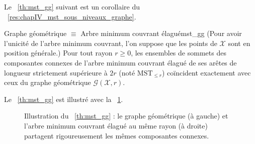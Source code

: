 
Le \Th~\ref{th:mst_gg} suivant est un corollaire du \Res~\ref{res:chapIV_mst_sous_niveaux_graphe}.

\begin{Theoreme}{Graphe géométrique $\equiv$ Arbre minimum couvrant élagué}{mst_gg}
(Pour avoir l'unicité de l'arbre minimum couvrant, l'on suppose que les points de $\mathcal X$ sont en position générale.) 
Pour tout rayon $r \ge 0$, les ensembles de sommets des composantes connexes de l'arbre minimum couvrant élagué de ses arêtes de longueur strictement supérieure à $2r$ (noté $\mathrm{MST}_{\le r}$) coïncident exactement avec ceux du graphe géométrique $\mathcal{G}(\mathcal{X}, r)$.
\end{Theoreme}

Le \Th~\ref{th:mst_gg} est illustré avec la \Fig~\ref{fig:MST_GrapheGeometrique}.

\begin{figure}[!ht]
  \centering
  
  \caption{Illustration du \Th~\ref{th:mst_gg} : le graphe géométrique (à gauche) et l'arbre minimum couvrant élagué au même rayon (à droite) partagent rigoureusement les mêmes composantes connexes.\label{fig:MST_GrapheGeometrique}}
\end{figure}






